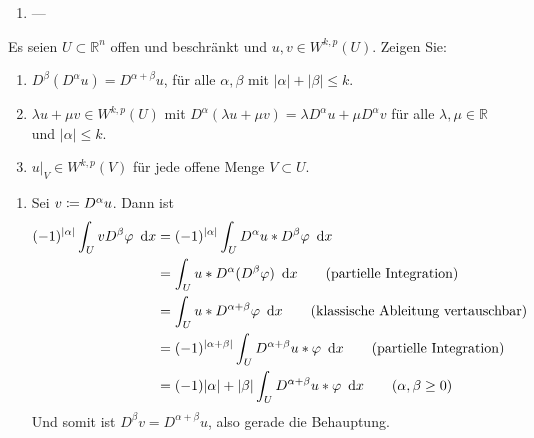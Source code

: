\begin{exercisePage}
\begin{enumerate}[label=(zu \alph*), leftmargin=*]
		\item ---
	\end{enumerate}


	\begin{task}
		Es seien $U \subset \mathbb R^n$ offen und beschränkt und $u,v \in W^{k,p}(U)$. Zeigen Sie:
		\begin{enumerate}
			\item $D^\beta(D^\alpha u) = D^{\alpha + \beta} u$, für alle $\alpha, \beta$ mit $|\alpha| + |\beta| \leq k$. 
			\item $\lambda u + \mu v \in W^{k,p}(U)$ mit $D^\alpha(\lambda u + \mu v) = \lambda D^\alpha u + \mu D^\alpha v$ für alle $\lambda, \mu \in \mathbb{R}$ und $|\alpha|\leq k$.
			\item $u|_V \in W^{k,p}(V)$ für jede offene Menge $V\subset U$.
		\end{enumerate}	
	\end{task}
	\begin{enumerate}[label=(zu \alph*), leftmargin=*]
		\item Sei $v \coloneqq D^\alpha u$. Dann ist
		\begin{align*}
			(-1)^{\left| \alpha \right|} \int_U v D^\beta \varphi \enskip \mathrm{d}x 
			&= (-1)^{\left| \alpha \right|}  \int_U D^\alpha u * D^\beta \varphi \enskip \mathrm{d}x \\
			&= \int_U u * D^\alpha (D^\beta \varphi) \enskip \mathrm{d}x \tag{partielle Integration}\\
			&= \int_U u * D^{\alpha + \beta} \varphi \enskip \mathrm{d}x \tag{klassische Ableitung vertauschbar} \\
			&= (-1)^{\left| \alpha + \beta \right|} \int_U D^{\alpha + \beta} u * \varphi \enskip \mathrm{d}x
			\tag{partielle Integration} \\
			&= (-1){\left| \alpha \right| + \left| \beta \right|} \int_U D^{\alpha + \beta} u * \varphi \enskip \mathrm{d}x \tag{$\alpha, \beta \ge 0$}
		\end{align*}
		Und somit ist $D^\beta v = D^{\alpha + \beta} u$, also gerade die Behauptung.
		

\end{enumerate}
\end{exercisePage}
